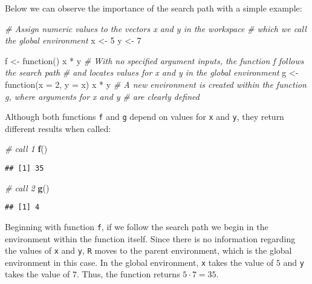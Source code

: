 \documentclass[11,]{article}
\newenvironment{Shaded}{\begin{snugshade}}{\end{snugshade}}
\newcommand{\KeywordTok}[1]{\textcolor[rgb]{0.13,0.29,0.53}{\textbf{{#1}}}}
\newcommand{\DataTypeTok}[1]{\textcolor[rgb]{0.13,0.29,0.53}{{#1}}}
\newcommand{\DecValTok}[1]{\textcolor[rgb]{0.00,0.00,0.81}{{#1}}}
\newcommand{\StringTok}[1]{\textcolor[rgb]{0.31,0.60,0.02}{{#1}}}
\newcommand{\CommentTok}[1]{\textcolor[rgb]{0.56,0.35,0.01}{\textit{{#1}}}}
\newcommand{\NormalTok}[1]{{#1}}
\begin{document}
Below we can observe the importance of the search path with a simple
example:

\begin{Shaded}
\begin{Highlighting}[]
\CommentTok{# Assign numeric values to the vectors x and y in the workspace }
\CommentTok{# which we call the global environment}
\NormalTok{x <-}\StringTok{ }\DecValTok{5}
\NormalTok{y <-}\StringTok{ }\DecValTok{7}

\NormalTok{f <-}\StringTok{ }\NormalTok{function() x *}\StringTok{ }\NormalTok{y}
  \CommentTok{# With no specified argument inputs, the function f follows the search path}
  \CommentTok{# and locates values for x and y in the global environment}
\NormalTok{g <-}\StringTok{ }\NormalTok{function(}\DataTypeTok{x =} \DecValTok{2}\NormalTok{, }\DataTypeTok{y =} \NormalTok{x) x *}\StringTok{ }\NormalTok{y}
  \CommentTok{# A new environment is created within the function g, where arguments for x and y}
  \CommentTok{# are clearly defined}
\end{Highlighting}
\end{Shaded}

Although both functions \texttt{f} and \texttt{g} depend on values for
\texttt{x} and \texttt{y}, they return different results when called:

\begin{Shaded}
\begin{Highlighting}[]
\CommentTok{# call 1}
\KeywordTok{f}\NormalTok{()}
\end{Highlighting}
\end{Shaded}

\begin{verbatim}
## [1] 35
\end{verbatim}

\begin{Shaded}
\begin{Highlighting}[]
\CommentTok{# call 2}
\KeywordTok{g}\NormalTok{()}
\end{Highlighting}
\end{Shaded}

\begin{verbatim}
## [1] 4
\end{verbatim}

Beginning with function \texttt{f}, if we follow the search path we
begin in the environment within the function itself. Since there is no
information regarding the values of \texttt{x} and \texttt{y},
\texttt{R} moves to the parent environment, which is the global
environment in this case. In the global environment, \texttt{x} takes
the value of \(5\) and \texttt{y} takes the value of \(7\). Thus, the
function returns \(5 \cdot 7=35\).
\end{document}
